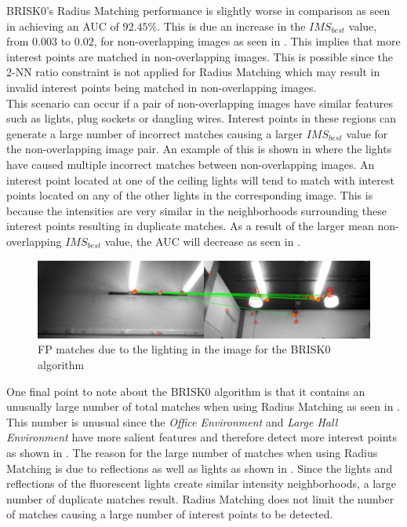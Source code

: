 \documentclass[11pt]{report}
\begin{document}
BRISK0's Radius Matching performance is slightly worse in comparison as seen in  achieving an AUC of $92.45\%$. This is due an increase in the $IMS_{best}$ value, from $0.003$ to $0.02$, for non-overlapping images as seen in . This implies that more interest points are matched in non-overlapping images. This is possible since the 2-NN ratio constraint is not applied for Radius Matching which may result in invalid interest points being matched in non-overlapping images.\\

This scenario can occur if a pair of non-overlapping images have similar features such as lights, plug sockets or dangling wires. Interest points in these regions can generate a large number of incorrect matches causing a larger $IMS_{best}$ value for the non-overlapping image pair. An example of this is shown in  where the lights have caused multiple incorrect matches between non-overlapping images. An interest point located at one of the ceiling lights will tend to match with interest points located on any of the other lights in the corresponding image. This is because the intensities are very similar in the neighborhoods surrounding these interest points resulting in duplicate matches. As a result of the larger mean non-overlapping $IMS_{best}$ value, the AUC will decrease as seen in .\\

\begin{figure}
  \centering
    \includegraphics[width=1.0\textwidth]{../Drawings/Matching/fpMatchBRISK0.jpg}
    \caption{FP matches due to the lighting in the image for the BRISK0 algorithm} 
    \label{fig:duplicateMatchesBrisk0}
\end{figure}

One final point to note about the BRISK0 algorithm is that it contains an unusually large number of total matches when using Radius Matching as seen in . This number is unusual since the \textit{Office Environment} and \textit{Large Hall Environment} have more salient features and therefore detect more interest points as shown in . The reason for the large number of matches when using Radius Matching is due to reflections as well as lights as shown in . Since the lights and reflections of the fluorescent lights create similar intensity neighborhoods, a large number of duplicate matches result. Radius Matching does not limit the number of matches causing a large number of interest points to be detected.\\
\end{document}
